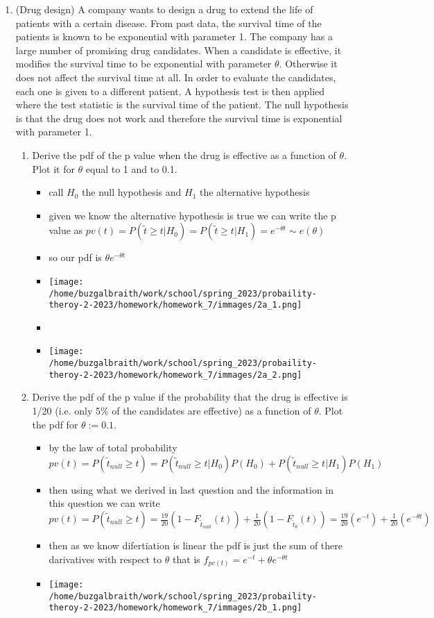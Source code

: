 \documentclass[12pt,twoside]{article}
\begin{document}
\begin{enumerate}
\item (Drug design) 
A company wants to design a drug to extend the life of patients with a certain disease. From past data, the survival time of the patients is known to be exponential with parameter 1. The company has a large number of promising drug candidates. When a candidate is effective, it modifies the survival time to be exponential with parameter $\theta$. Otherwise it does not affect the survival time at all. In order to evaluate the candidates, each one is given to a different patient. A hypothesis test is then applied where the test statistic is the survival time of the patient. The null hypothesis is that the drug does not work and therefore the survival time is exponential with parameter 1. 

\begin{enumerate}
\item Derive the pdf of the p value when the drug is effective as a function of $\theta$. Plot it for $\theta$ equal to 1 and to 0.1.
\begin{itemize}
  \color{blue}
  \item call $H_{0}$ the null hypothesis and $H_{1}$ the alternative hypothesis
  \item given we know the alternative hypothesis is true we can write the p value as $pv(t)=P(\tilde{t}\geq t|H_0)=P(\tilde{t}\geq t|H_1)=e^{-\theta t}\sim e(\theta)$
  \item so our pdf is $\theta e^{-\theta t}$
  \item \texttt{[image: /home/buzgalbraith/work/school/spring\_2023/probaility-theroy-2-2023/homework/homework\_7/immages/2a\_1.png]}
  \item 
  \item \texttt{[image: /home/buzgalbraith/work/school/spring\_2023/probaility-theroy-2-2023/homework/homework\_7/immages/2a\_2.png]}
\end{itemize}

\item Derive the pdf of the p value if the probability that the drug is effective is 1/20 (i.e. only 5\% of the candidates are effective) as a function of $\theta$. Plot the pdf for $\theta:=0.1$. 
\begin{itemize}
  \color{blue}
  \item by the law of total probability $pv(t)=P(\tilde{t}_{null}\geq t)=P(\tilde{t}_{null}\geq t|H_0)P(H_0)+P(\tilde{t}_{null}\geq t|H_1)P(H_1)$
  \item then using what we derived in last question and the information in this question we can write $pv(t)=P(\tilde{t}_{null}\geq t)=\frac{19}{20}(1-F_{\tilde{t}_{null}}(t))+\frac{1}{20}(1-F_{\tilde{t}_{\theta}}(t))=\frac{19}{20}(e^{-t})+\frac{1}{20}(e^{-\theta t})$
  \item then as we know difertiation is linear the pdf is just the sum of there darivatives with respect to $\theta$ that is $f_{pv(t)}=e^{-t}+\theta e^{-\theta t}$
  \item \texttt{[image: /home/buzgalbraith/work/school/spring\_2023/probaility-theroy-2-2023/homework/homework\_7/immages/2b\_1.png]} 
\end{itemize}


\end{enumerate}
\end{enumerate}
\end{document}
